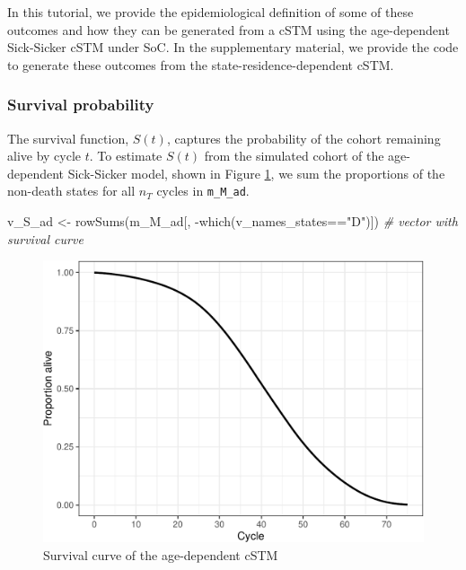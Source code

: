 \documentclass[
]{article}
\newenvironment{Shaded}{\begin{snugshade}}{\end{snugshade}}
\newcommand{\CommentTok}[1]{\textcolor[rgb]{0.56,0.35,0.01}{\textit{#1}}}
\newcommand{\FunctionTok}[1]{\textcolor[rgb]{0.00,0.00,0.00}{#1}}
\newcommand{\NormalTok}[1]{#1}
\newcommand{\OtherTok}[1]{\textcolor[rgb]{0.56,0.35,0.01}{#1}}
\newcommand{\SpecialCharTok}[1]{\textcolor[rgb]{0.00,0.00,0.00}{#1}}
\newcommand{\StringTok}[1]{\textcolor[rgb]{0.31,0.60,0.02}{#1}}
\begin{document}
In this tutorial, we provide the epidemiological definition of some of these outcomes and how they can be generated from a cSTM using the age-dependent Sick-Sicker cSTM under SoC. In the supplementary material, we provide the code to generate these outcomes from the state-residence-dependent cSTM.

\hypertarget{survival-probability}{%
\subsubsection{Survival probability}\label{survival-probability}}

The survival function, \(S(t)\), captures the probability of the cohort remaining alive by cycle \(t\). To estimate \(S(t)\) from the simulated cohort of the age-dependent Sick-Sicker model, shown in Figure \ref{fig:Sick-Sicker-Surv-AgeDep}, we sum the proportions of the non-death states for all \(n_T\) cycles in \texttt{m\_M\_ad}.

\begin{Shaded}
\begin{Highlighting}[]
\NormalTok{v\_S\_ad }\OtherTok{\textless{}{-}} \FunctionTok{rowSums}\NormalTok{(m\_M\_ad[, }\SpecialCharTok{{-}}\FunctionTok{which}\NormalTok{(v\_names\_states}\SpecialCharTok{==}\StringTok{"D"}\NormalTok{)]) }\CommentTok{\# vector with survival curve}
\end{Highlighting}
\end{Shaded}

\begin{figure}[H]

{\centering \includegraphics{../figs/Sick-Sicker-Surv-AgeDep-1} 

}

\caption{Survival curve of the age-dependent cSTM}\label{fig:Sick-Sicker-Surv-AgeDep}
\end{figure}
\end{document}

